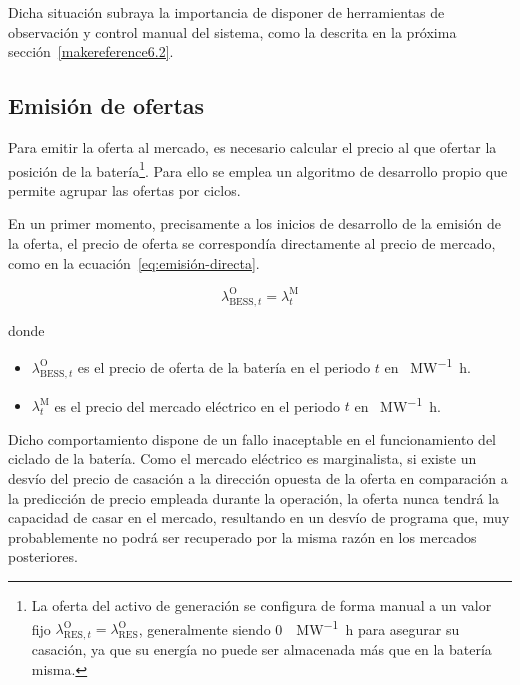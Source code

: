 Dicha situación subraya la importancia de disponer de herramientas de observación y control manual del sistema, como la descrita en la próxima sección~\ref{makereference6.2}.

\subsection{Emisión de ofertas}%
\label{makereference6.1.2}

Para emitir la oferta al mercado, es necesario calcular el precio al que ofertar la posición de la batería\footnote{La oferta del activo de generación se configura de forma manual a un valor fijo \( \lambda^{\mathrm{O}}_{\text{RES}, t} = \lambda^{\mathrm{O}}_{\text{RES}} \), generalmente siendo \SI{0}{\text{\euro}\per\mega\watt\hour} para asegurar su casación, ya que su energía no puede ser almacenada más que en la batería misma.}. Para ello se emplea un algoritmo de desarrollo propio que permite agrupar las ofertas por ciclos.

En un primer momento, precisamente a los inicios de desarrollo de la emisión de la oferta, el precio de oferta se correspondía directamente al precio de mercado, como en la ecuación~\ref{eq:emisión-directa}.

\begin{samepage}

  \begin{equation}%
    \label{eq:emisión-directa}
    \lambda^{\mathrm{O}}_{\mathrm{BESS}, t} = \lambda^{\mathrm{M}}_{t}
  \end{equation}

  donde

  \begin{itemize}

    \item \( \lambda^{\mathrm{O}}_{\mathrm{BESS}, t} \) es el precio de oferta de la batería en el periodo \( t \) en \si{\text{\euro}\per\mega\watt\hour}.

    \item \( \lambda^{\mathrm{M}}_{t} \) es el precio del mercado eléctrico en el periodo \( t \) en \si{\text{\euro}\per\mega\watt\hour}.

  \end{itemize}

\end{samepage}

Dicho comportamiento dispone de un fallo inaceptable en el funcionamiento del ciclado de la batería. Como el mercado eléctrico es marginalista, si existe un desvío del precio de casación a la dirección opuesta de la oferta en comparación a la predicción de precio empleada durante la operación, la oferta nunca tendrá la capacidad de casar en el mercado, resultando en un desvío de programa que, muy probablemente no podrá ser recuperado por la misma razón en los mercados posteriores.


